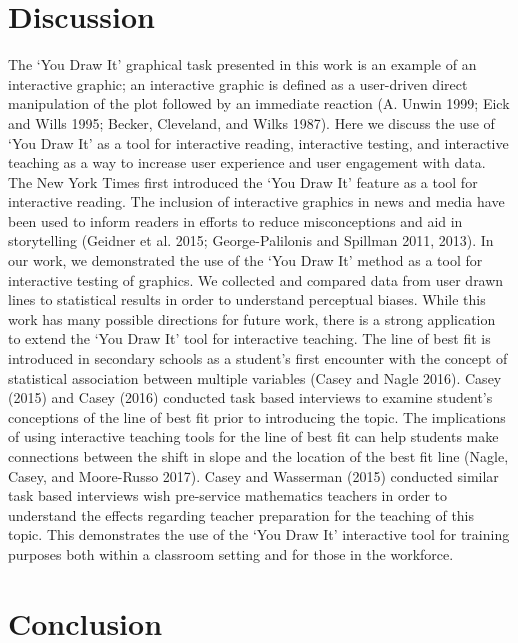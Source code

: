 \documentclass[
]{jds}
\begin{document}
\hypertarget{discussion}{%
\section{Discussion}\label{discussion}}

The `You Draw It' graphical task presented in this work is an example of
an interactive graphic; an interactive graphic is defined as a
user-driven direct manipulation of the plot followed by an immediate
reaction (A. Unwin 1999; Eick and Wills 1995; Becker, Cleveland, and
Wilks 1987). Here we discuss the use of `You Draw It' as a tool for
interactive reading, interactive testing, and interactive teaching as a
way to increase user experience and user engagement with data. The New
York Times first introduced the `You Draw It' feature as a tool for
interactive reading. The inclusion of interactive graphics in news and
media have been used to inform readers in efforts to reduce
misconceptions and aid in storytelling (Geidner et al. 2015;
George-Palilonis and Spillman 2011, 2013). In our work, we demonstrated
the use of the `You Draw It' method as a tool for interactive testing of
graphics. We collected and compared data from user drawn lines to
statistical results in order to understand perceptual biases. While this
work has many possible directions for future work, there is a strong
application to extend the `You Draw It' tool for interactive teaching.
The line of best fit is introduced in secondary schools as a student's
first encounter with the concept of statistical association between
multiple variables (Casey and Nagle 2016). Casey (2015) and Casey (2016)
conducted task based interviews to examine student's conceptions of the
line of best fit prior to introducing the topic. The implications of
using interactive teaching tools for the line of best fit can help
students make connections between the shift in slope and the location of
the best fit line (Nagle, Casey, and Moore-Russo 2017). Casey and
Wasserman (2015) conducted similar task based interviews wish
pre-service mathematics teachers in order to understand the effects
regarding teacher preparation for the teaching of this topic. This
demonstrates the use of the `You Draw It' interactive tool for training
purposes both within a classroom setting and for those in the workforce.

\hypertarget{conclusion}{%
\section{Conclusion}\label{conclusion}}
\end{document}

